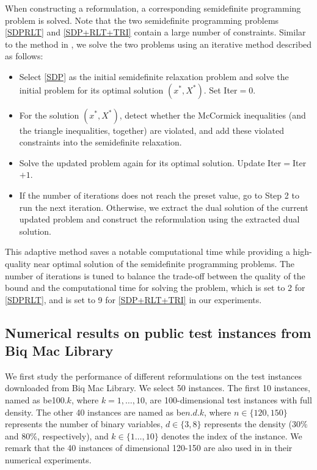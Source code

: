 \documentclass[pdflatex,sn-mathphys-num]{sn-jnl}%
\theoremstyle{thmstyleone}%
\theoremstyle{thmstyletwo}%
\theoremstyle{thmstylethree}%
\begin{document}
When constructing a reformulation, a corresponding semidefinite programming problem is solved. Note that the two semidefinite programming problems \eqref{SDPRLT} and  \eqref{SDP+RLT+TRI} contain a large number of constraints. Similar to the method in \cite{QNR}, we solve the two problems using an iterative method described as follows:
\begin{itemize}
	\item[1.] Select \eqref{SDP} as the initial semidefinite relaxation problem and solve the initial problem for its optimal solution $(x^\ast,X^\ast)$. Set Iter$=0$.
	\item[2.] For the solution $(x^\ast,X^\ast)$, detect whether %
	the McCormick inequalities (and the triangle inequalities, together) are violated, and add these violated constraints into the semidefinite relaxation.
	\item[3.] Solve the updated problem again for its optimal solution. Update Iter$=$Iter$+1$.
	\item[4.] If the number of iterations does not reach the preset value, go to Step 2 to run the next iteration. Otherwise, we extract the dual solution of the current updated problem and construct the reformulation using the extracted dual solution.
\end{itemize}
This adaptive method saves a notable computational time while providing a high-quality near optimal solution of the semidefinite programming problems. The number of iterations is tuned to balance the trade-off between the quality of the bound and the computational time for solving the problem, which is set to 2 for \eqref{SDPRLT}, and is set to 9 for \eqref{SDP+RLT+TRI} in our experiments.


\subsection{Numerical results on public test instances from Biq Mac Library}\label{sec41}

We first study the performance of different reformulations on the test instances downloaded from Biq Mac Library. We select 50 instances. The first 10 instances, named as be100.$k$, where $k=1,\ldots,10$, are 100-dimensional test instances with full density. The other 40 instances are named as be$n$.$d$.$k$, where $n\in\{120,150\}$ represents the number of binary variables, $d\in\{3,8\}$ represents the density ($30\%$ and $80\%$, respectively), and $k\in\{1\ldots,10\}$ denotes the index of the instance. We remark that the 40 instances of dimensional 120-150 are also used in \cite{Locatelli2024} in their numerical experiments.
\end{document}
